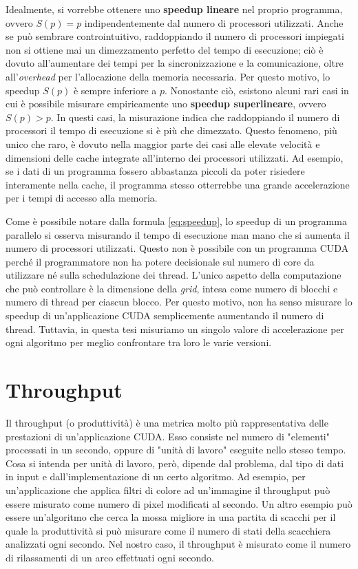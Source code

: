 \documentclass[12pt,a4paper,oneside]{book}
\begin{document}
	Idealmente, si vorrebbe ottenere uno \textbf{speedup lineare} nel proprio programma, ovvero $S(p) = p$ indipendentemente dal numero di processori utilizzati. Anche se può sembrare controintuitivo, raddoppiando il numero di processori impiegati non si ottiene mai un dimezzamento perfetto del tempo di esecuzione; ciò è dovuto all'aumentare dei tempi per la sincronizzazione e la comunicazione, oltre all'\textit{overhead} per l'allocazione della memoria necessaria. Per questo motivo, lo speedup $S(p)$ è sempre inferiore a $p$. Nonostante ciò, esistono alcuni rari casi in cui è possibile misurare empiricamente uno \textbf{speedup superlineare}, ovvero $S(p) > p$. In questi casi, la misurazione indica che raddoppiando il numero di processori il tempo di esecuzione si è più che dimezzato. Questo fenomeno, più unico che raro, è dovuto nella maggior parte dei casi alle elevate velocità e dimensioni delle cache integrate all'interno dei processori utilizzati. Ad esempio, se i dati di un programma fossero abbastanza piccoli da poter risiedere interamente nella cache, il programma stesso otterrebbe una grande accelerazione per i tempi di accesso alla memoria.
	
	Come è possibile notare dalla formula \ref{eq:speedup}, lo speedup di un programma parallelo si osserva misurando il tempo di esecuzione man mano che si aumenta il numero di processori utilizzati. Questo non è possibile con un programma CUDA perché il programmatore non ha potere decisionale sul numero di core da utilizzare né sulla schedulazione dei thread. L'unico aspetto della computazione che può controllare è la dimensione della \textit{grid}, intesa come numero di blocchi e numero di thread per ciascun blocco. Per questo motivo, non ha senso misurare lo speedup di un'applicazione CUDA semplicemente aumentando il numero di thread. Tuttavia, in questa tesi misuriamo un singolo valore di accelerazione per ogni algoritmo per meglio confrontare tra loro le varie versioni.
	
	\section{Throughput}
	Il throughput (o produttività) è una metrica molto più rappresentativa delle prestazioni di un'applicazione CUDA. Esso consiste nel numero di "elementi" processati in un secondo, oppure di "unità di lavoro" eseguite nello stesso tempo. Cosa si intenda per unità di lavoro, però, dipende dal problema, dal tipo di dati in input e dall'implementazione di un certo algoritmo. Ad esempio, per un'applicazione che applica filtri di colore ad un'immagine il throughput può essere misurato come numero di pixel modificati al secondo. Un altro esempio può essere un'algoritmo che cerca la mossa migliore in una partita di scacchi per il quale la produttività si può misurare come il numero di stati della scacchiera analizzati ogni secondo. Nel nostro caso, il throughput è misurato come il numero di rilassamenti di un arco effettuati ogni secondo.
	
\end{document}
